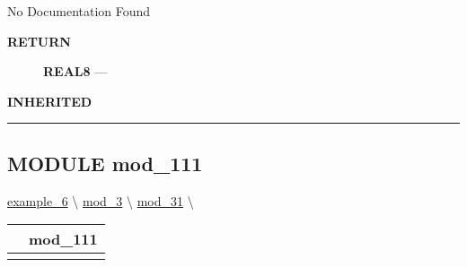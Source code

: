 \par





No Documentation Found








\par
\begin{description}
\item [\colorbox{tagtype}{\color{white} \textbf{\textsf{RETURN}}}] \textbf{REAL8} --- 
\end{description}






\par
\begin{description}
\item [\colorbox{tagtype}{\color{white} \textbf{\textsf{INHERITED}}}] 
\end{description}



\rule{\linewidth}{0.5pt}
\subsection*{\textsf{\colorbox{headtoc}{\color{white} MODULE}
mod\_111}}

\hypertarget{ecldoc:intest.example_6.mod_1.mod_11.mod_111}{}
\hspace{0pt} \hyperlink{ecldoc:intest.example_6}{example_6} \textbackslash 
\hspace{0pt} \hyperlink{ecldoc:intest.example_6.mod_3}{mod_3} \textbackslash 
\hspace{0pt} \hyperlink{ecldoc:intest.example_6.mod_3.mod_31}{mod_31} \textbackslash 

{\renewcommand{\arraystretch}{1.5}
\begin{tabularx}{\textwidth}{|>{\raggedright\arraybackslash}l|X|}
\hline
\hspace{0pt}\mytexttt{\color{red} } & \textbf{mod\_111} \\
\hline
\multicolumn{2}{|>{\raggedright\arraybackslash}X|}{\hspace{0pt}\mytexttt{\color{param} (real8 a\_111)}} \\
\hline
\end{tabularx}
}

\par





